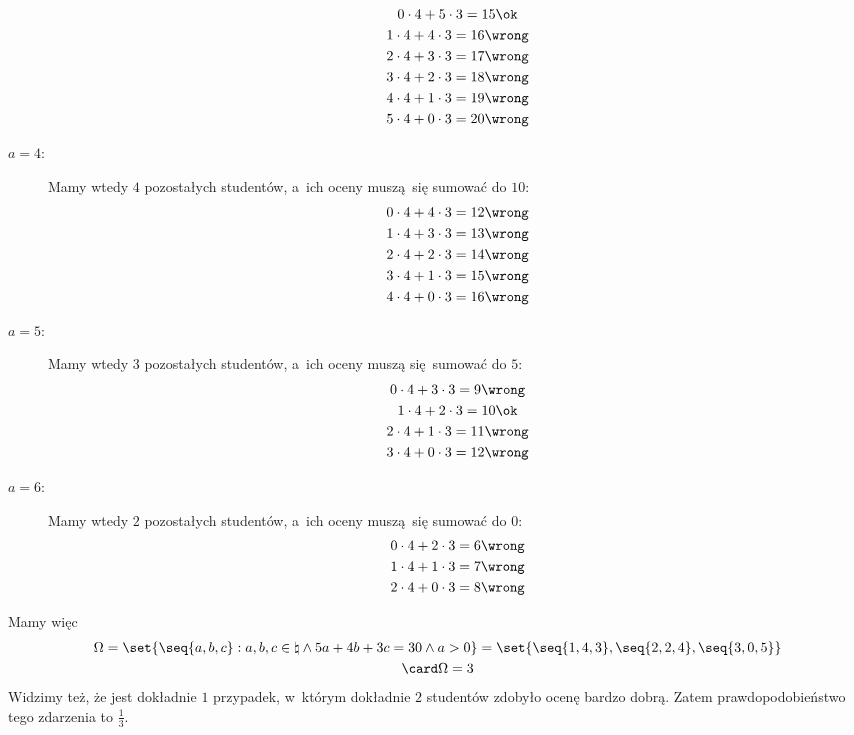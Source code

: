 \begin{description}
        \begin{gather*}
            0 \cdot 4 + 5 \cdot 3 = 15 \ok\\
            1 \cdot 4 + 4 \cdot 3 = 16 \wrong\\
            2 \cdot 4 + 3 \cdot 3 = 17 \wrong\\
            3 \cdot 4 + 2 \cdot 3 = 18 \wrong\\
            4 \cdot 4 + 1 \cdot 3 = 19 \wrong\\
            5 \cdot 4 + 0 \cdot 3 = 20 \wrong
        \end{gather*}
    \item[\(a = 4\):] Mamy wtedy \(4\) pozostałych studentów, a~ich oceny muszą się sumować do \(10\):
        \begin{gather*}
            0 \cdot 4 + 4 \cdot 3 = 12 \wrong\\
            1 \cdot 4 + 3 \cdot 3 = 13 \wrong\\
            2 \cdot 4 + 2 \cdot 3 = 14 \wrong\\
            3 \cdot 4 + 1 \cdot 3 = 15 \wrong\\
            4 \cdot 4 + 0 \cdot 3 = 16 \wrong
        \end{gather*}
    \item[\(a = 5\):] Mamy wtedy \(3\) pozostałych studentów, a~ich oceny muszą się sumować do \(5\):
        \begin{gather*}
            0 \cdot 4 + 3 \cdot 3 = 9 \wrong\\
            1 \cdot 4 + 2 \cdot 3 = 10 \ok\\
            2 \cdot 4 + 1 \cdot 3 = 11 \wrong\\
            3 \cdot 4 + 0 \cdot 3 = 12 \wrong
        \end{gather*}
    \item[\(a = 6\):] Mamy wtedy \(2\) pozostałych studentów, a~ich oceny muszą się sumować do \(0\):
        \begin{gather*}
            0 \cdot 4 + 2 \cdot 3 = 6 \wrong\\
            1 \cdot 4 + 1 \cdot 3 = 7 \wrong\\
            2 \cdot 4 + 0 \cdot 3 = 8 \wrong
        \end{gather*}
\end{description}
Mamy więc
\begin{gather*}
    \Omega
    = \set{\seq{a, b, c} : a, b, c \in \natural \land 5a + 4b + 3c = 30 \land a > 0}
    = \set{\seq{1, 4, 3}, \seq{2, 2, 4}, \seq{3, 0, 5}}\\
    \card\Omega = 3
\end{gather*}
Widzimy też, że jest dokładnie \(1\) przypadek, w~którym dokładnie \(2\) studentów zdobyło ocenę bardzo dobrą. Zatem prawdopodobieństwo tego zdarzenia to \(\frac{1}{3}\).

